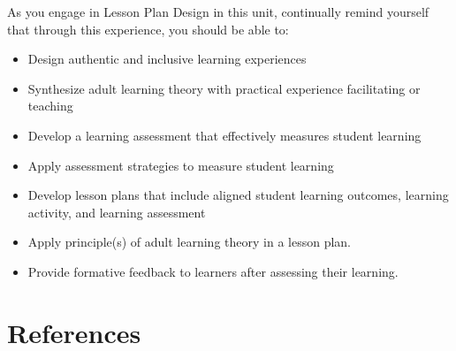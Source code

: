 \documentclass[
]{book}
\providecommand{\tightlist}{%
  \setlength{\itemsep}{0pt}\setlength{\parskip}{0pt}}
\begin{document}
\begin{progress}
As you engage in Lesson Plan Design in this unit, continually remind yourself that through this experience, you should be able to:

\begin{itemize}
\tightlist
\item
  Design authentic and inclusive learning experiences\\
\item
  Synthesize adult learning theory with practical experience facilitating or teaching\\
\item
  Develop a learning assessment that effectively measures student learning\\
\item
  Apply assessment strategies to measure student learning\\
\item
  Develop lesson plans that include aligned student learning outcomes, learning activity, and learning assessment\\
\item
  Apply principle(s) of adult learning theory in a lesson plan.\\
\item
  Provide formative feedback to learners after assessing their learning.
\end{itemize}
\end{progress}

\hypertarget{references-2}{%
\section*{References}\label{references-2}}
\end{document}

